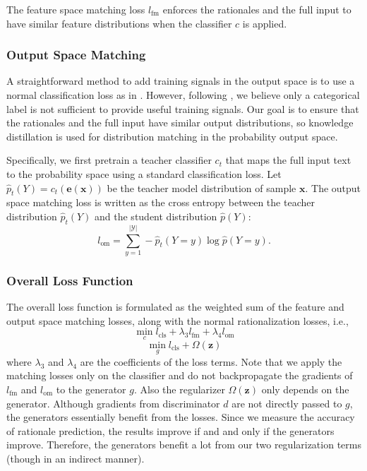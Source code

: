 \documentclass[letterpaper]{article} %
\begin{document}
The feature space matching loss $l_\text{fm}$ enforces the rationales and the full input to have similar feature distributions when the classifier $c$ is applied.

\subsubsection{Output Space Matching}

A straightforward method to add training signals in the output space is to use a normal classification loss as in \cite{lei2016rationalizing}. However, following \cite{hinton2015distilling}, we believe only a categorical label is not sufficient to provide useful training signals. Our goal is to ensure that the rationales and the full input have similar output distributions, so knowledge distillation \cite{hinton2015distilling} is used for distribution matching in the probability output space.

Specifically, we first pretrain a teacher classifier $c_t$ that maps the full input text to the probability space using a standard classification loss. Let $\hat{p}_t(Y) = c_t(\mathbf{e}(\mathbf{x}))$ be the teacher model distribution of sample $\mathbf{x}$. The output space matching loss is written as the cross entropy between the teacher distribution $\hat{p}_t(Y)$ and the student distribution $\hat{p}(Y)$:
\[
l_\text{om} = \sum_{y = 1}^{|\mathcal{Y}|} - \hat{p}_t(Y = y) \log \hat{p}(Y = y).
\]

\subsubsection{Overall Loss Function}
\label{ssub:overall}
The overall loss function is formulated as the weighted sum of the feature and output space matching losses, along with the normal rationalization losses, i.e.,
\[
\min_c l_\text{cls} + \lambda_3 l_\text{fm} + \lambda_4 l_\text{om}
\]
\[
\min_g l_\text{cls} + \Omega(\mathbf{z})
\]
where $\lambda_3$ and $\lambda_4$ are the coefficients of the loss terms. Note that we apply the matching losses only on the classifier and do not backpropagate the gradients of $l_\text{fm}$ and $l_\text{om}$ to the generator $g$. Also the regularizer $\Omega(\mathbf{z})$ only depends on the generator. Although gradients from discriminator $d$ are not directly passed to $g$, the generators essentially benefit from the losses. 
Since we measure the accuracy of rationale prediction, the results improve if and and only if the generators improve. Therefore, the generators benefit a lot from our two regularization terms (though in an indirect manner).
\end{document}
